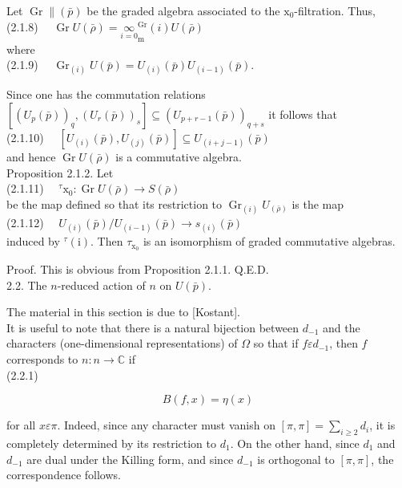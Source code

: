 \documentclass[10pt]{article}
\begin{document}
Let $\operatorname{Gr} \|(\bar{p})$ be the graded algebra associated to the $\mathrm{x}_{0}$-filtration. Thus,\\
(2.1.8) $\quad \operatorname{Gr} U(\bar{\rho})={\underset{i=0}{\infty}}_{\operatorname{m}}^{\operatorname{Gr}}(i) U(\bar{\rho})$\\
where\\
(2.1.9) $\quad \operatorname{Gr}_{(i)} U(\bar{p})=U_{(i)}(\bar{p}) U_{(i-1)}(\bar{p})$.

Since one has the commutation relations $\left[\left(U_{p}(\bar{p})\right)_{q},\left(U_{r}(\bar{p})\right)_{s}\right] \subseteq\left(U_{p+r-1}(\bar{p})\right)_{q+s}$ it follows that\\
(2.1.10) $\quad\left[U_{(i)}(\bar{p}), U_{(j)}(\bar{p})\right] \subseteq U_{(i+j-1)}(\bar{p})$\\
and hence $\operatorname{Gr} U(\bar{\rho})$ is a commutative algebra.\\
Proposition 2.1.2. Let\\
(2.1.11) $\quad{ }^{\tau} \mathrm{x}_{0}: \operatorname{Gr} U(\bar{\rho}) \rightarrow S(\bar{\rho})$\\
be the map defined so that its restriction to $\operatorname{Gr}_{(i)} U_{(\bar{\rho})}$ is the map\\
(2.1.12) $\quad U_{(i)}(\bar{p}) / U_{(i-1)}(\bar{p}) \rightarrow s_{(i)}(\bar{p})$\\
induced by ${ }^{\tau}(\mathrm{i})$. Then $\tau_{\mathrm{x}_{0}}$ is an isomorphism of graded commutative algebras.

Proof. This is obvious from Proposition 2.1.1. Q.E.D.\\
2.2. The $n$-reduced action of $n$ on $U(\bar{p})$.

The material in this section is due to [Kostant].\\
It is useful to note that there is a natural bijection between $d_{-1}$ and the characters (one-dimensional representations) of $\Omega$ so that if $f \varepsilon d_{-1}$, then $f$ corresponds to $n: n \rightarrow \mathbb{C}$ if\\
(2.2.1)

$$
B(f, x)=\eta(x)
$$

for all $x \varepsilon \pi$. Indeed, since any character must vanish on $[\pi, \pi]=\sum_{i \geq 2} d_{i}$, it is completely determined by its restriction to $d_{1}$. On the other hand, since $d_{1}$ and $d_{-1}$ are dual under the Killing form, and since $d_{-1}$ is orthogonal to $[\pi, \pi]$, the correspondence follows.
\end{document}
